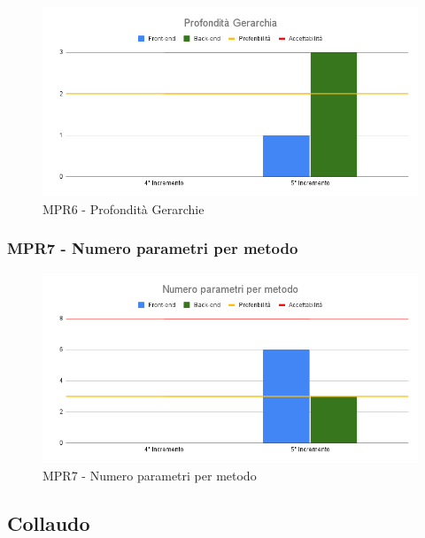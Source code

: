 \begin{figure}[H]
	\centering
	\includegraphics[scale = 0.6]{sezioni/Images/PB/Gerarchia.png}
	\caption{MPR6 - Profondità Gerarchie}
\end{figure}

\subsubsection{MPR7 - Numero parametri per metodo}

\begin{figure}[H]
	\centering
	\includegraphics[scale = 0.6]{sezioni/Images/PB/ParamMetod.png}
	\caption{MPR7 - Numero parametri per metodo}
\end{figure}

\subsection{Collaudo}
